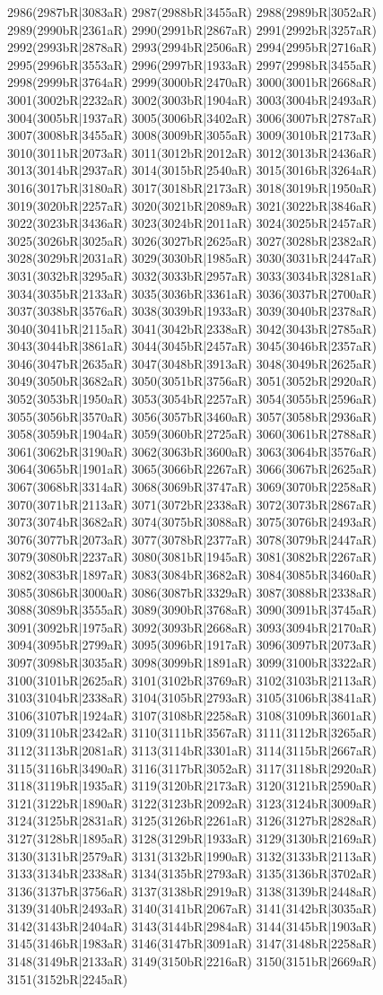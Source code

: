 2986(2987bR|3083aR) 2987(2988bR|3455aR) 2988(2989bR|3052aR) 2989(2990bR|2361aR) 2990(2991bR|2867aR) 2991(2992bR|3257aR) 2992(2993bR|2878aR) 2993(2994bR|2506aR) 2994(2995bR|2716aR) 2995(2996bR|3553aR) 2996(2997bR|1933aR) 2997(2998bR|3455aR) 2998(2999bR|3764aR) 2999(3000bR|2470aR) 3000(3001bR|2668aR) 3001(3002bR|2232aR) 3002(3003bR|1904aR) 3003(3004bR|2493aR) 3004(3005bR|1937aR) 3005(3006bR|3402aR) 3006(3007bR|2787aR) 3007(3008bR|3455aR) 3008(3009bR|3055aR) 3009(3010bR|2173aR) 3010(3011bR|2073aR) 3011(3012bR|2012aR) 3012(3013bR|2436aR) 3013(3014bR|2937aR) 3014(3015bR|2540aR) 3015(3016bR|3264aR) 3016(3017bR|3180aR) 3017(3018bR|2173aR) 3018(3019bR|1950aR) 3019(3020bR|2257aR) 3020(3021bR|2089aR) 3021(3022bR|3846aR) 3022(3023bR|3436aR) 3023(3024bR|2011aR) 3024(3025bR|2457aR) 3025(3026bR|3025aR) 3026(3027bR|2625aR) 3027(3028bR|2382aR) 3028(3029bR|2031aR) 3029(3030bR|1985aR) 3030(3031bR|2447aR) 3031(3032bR|3295aR) 3032(3033bR|2957aR) 3033(3034bR|3281aR) 3034(3035bR|2133aR) 3035(3036bR|3361aR) 3036(3037bR|2700aR) 3037(3038bR|3576aR) 3038(3039bR|1933aR) 3039(3040bR|2378aR) 3040(3041bR|2115aR) 3041(3042bR|2338aR) 3042(3043bR|2785aR) 3043(3044bR|3861aR) 3044(3045bR|2457aR) 3045(3046bR|2357aR) 3046(3047bR|2635aR) 3047(3048bR|3913aR) 3048(3049bR|2625aR) 3049(3050bR|3682aR) 3050(3051bR|3756aR) 3051(3052bR|2920aR) 3052(3053bR|1950aR) 3053(3054bR|2257aR) 3054(3055bR|2596aR) 3055(3056bR|3570aR) 3056(3057bR|3460aR) 3057(3058bR|2936aR) 3058(3059bR|1904aR) 3059(3060bR|2725aR) 3060(3061bR|2788aR) 3061(3062bR|3190aR) 3062(3063bR|3600aR) 3063(3064bR|3576aR) 3064(3065bR|1901aR) 3065(3066bR|2267aR) 3066(3067bR|2625aR) 3067(3068bR|3314aR) 3068(3069bR|3747aR) 3069(3070bR|2258aR) 3070(3071bR|2113aR) 3071(3072bR|2338aR) 3072(3073bR|2867aR) 3073(3074bR|3682aR) 3074(3075bR|3088aR) 3075(3076bR|2493aR) 3076(3077bR|2073aR) 3077(3078bR|2377aR) 3078(3079bR|2447aR) 3079(3080bR|2237aR) 3080(3081bR|1945aR) 3081(3082bR|2267aR) 3082(3083bR|1897aR) 3083(3084bR|3682aR) 3084(3085bR|3460aR) 3085(3086bR|3000aR) 3086(3087bR|3329aR) 3087(3088bR|2338aR) 3088(3089bR|3555aR) 3089(3090bR|3768aR) 3090(3091bR|3745aR) 3091(3092bR|1975aR) 3092(3093bR|2668aR) 3093(3094bR|2170aR) 3094(3095bR|2799aR) 3095(3096bR|1917aR) 3096(3097bR|2073aR) 3097(3098bR|3035aR) 3098(3099bR|1891aR) 3099(3100bR|3322aR) 3100(3101bR|2625aR) 3101(3102bR|3769aR) 3102(3103bR|2113aR) 3103(3104bR|2338aR) 3104(3105bR|2793aR) 3105(3106bR|3841aR) 3106(3107bR|1924aR) 3107(3108bR|2258aR) 3108(3109bR|3601aR) 3109(3110bR|2342aR) 3110(3111bR|3567aR) 3111(3112bR|3265aR) 3112(3113bR|2081aR) 3113(3114bR|3301aR) 3114(3115bR|2667aR) 3115(3116bR|3490aR) 3116(3117bR|3052aR) 3117(3118bR|2920aR) 3118(3119bR|1935aR) 3119(3120bR|2173aR) 3120(3121bR|2590aR) 3121(3122bR|1890aR) 3122(3123bR|2092aR) 3123(3124bR|3009aR) 3124(3125bR|2831aR) 3125(3126bR|2261aR) 3126(3127bR|2828aR) 3127(3128bR|1895aR) 3128(3129bR|1933aR) 3129(3130bR|2169aR) 3130(3131bR|2579aR) 3131(3132bR|1990aR) 3132(3133bR|2113aR) 3133(3134bR|2338aR) 3134(3135bR|2793aR) 3135(3136bR|3702aR) 3136(3137bR|3756aR) 3137(3138bR|2919aR) 3138(3139bR|2448aR) 3139(3140bR|2493aR) 3140(3141bR|2067aR) 3141(3142bR|3035aR) 3142(3143bR|2404aR) 3143(3144bR|2984aR) 3144(3145bR|1903aR) 3145(3146bR|1983aR) 3146(3147bR|3091aR) 3147(3148bR|2258aR) 3148(3149bR|2133aR) 3149(3150bR|2216aR) 3150(3151bR|2669aR) 3151(3152bR|2245aR) 